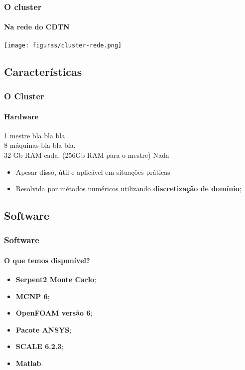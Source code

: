 \documentclass[svgnames,smaller,table]{beamer}
\begin{document}
\begin{frame}
  \frametitle{O cluster}
  \framesubtitle{Na rede do CDTN}
  \begin{center}
    \texttt{[image: figuras/cluster-rede.png]}
  \end{center}
  
\end{frame}


\subsection{Características}
\begin{frame}
  \frametitle{O Cluster}
  \framesubtitle{Hardware}
  1 mestre bla bla bla\\
  8 máquinas bla bla bla.
  \\
  \vspace{0.5cm}
  32 Gb RAM cada.
  (256Gb RAM para o mestre)
  \vspace{0.5cm}
  Nada
  \begin{itemize}
  \item Apesar disso, útil e aplicável em situações práticas
  \item Resolvida por métodos numéricos utilizando \textbf{discretização de domínio};
  \end{itemize}
\end{frame}


\subsection{Software}
\begin{frame}
  \frametitle{Software}
  \framesubtitle{O que temos disponível?}
\begin{itemize}
	\item \textbf{Serpent2 Monte Carlo};
	\item \textbf{MCNP 6};
	\item \textbf{OpenFOAM versão 6};
	\item \textbf{Pacote ANSYS};
	\item \textbf{SCALE 6.2.3};
	\item \textbf{Matlab}.
\end{itemize}

\end{frame}
\end{document}
